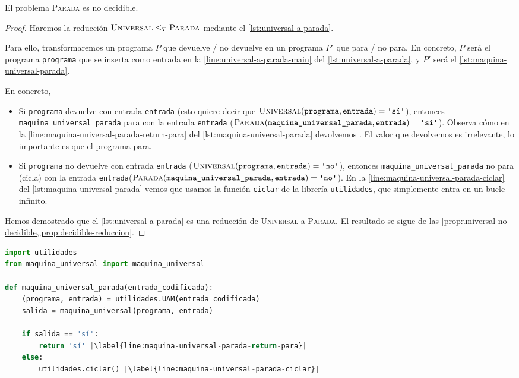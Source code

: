 \begin{proposicion}\label{prop:parada-no-decidible}
El problema \textsc{Parada} es no decidible.
\end{proposicion}
\begin{proof}
Haremos la reducción $\textsc{Universal}\leq_T\textsc{Parada}$ mediante el \cref{lst:universal-a-parada}.

Para ello, transformaremos un programa $P$ que devuelve  / no devuelve  en un programa $P'$ que para / no para. En concreto, $P$ será el programa \texttt{programa} que se inserta como entrada en la \cref{line:universal-a-parada-main} del \cref{lst:universal-a-parada}, y $P'$ será el \cref{lst:maquina-universal-parada}.

En concreto,
\begin{itemize}
    \item Si \texttt{programa} devuelve  con entrada \texttt{entrada} (esto quiere decir que \linebreak $\textsc{Universal}(\texttt{programa}, \texttt{entrada}) = \palabra{sí}$), entonces \texttt{maquina\_universal\_parada} para con la entrada \texttt{entrada} ($\textsc{Parada}(\texttt{maquina\_universal\_parada}, \texttt{entrada})=\palabra{sí}$). Observa cómo en la \cref{line:maquina-universal-parada-return-para} del \cref{lst:maquina-universal-parada} devolvemos . El valor que devolvemos es irrelevante, lo importante es que el programa para.
    \item Si \texttt{programa} no devuelve  con entrada \texttt{entrada} ($\textsc{Universal}(\texttt{programa}, \texttt{entrada}) = \palabra{no}$), entonces \texttt{maquina\_universal\_parada} no para (cicla) con la entrada \texttt{entrada}\linebreak($\textsc{Parada}(\texttt{maquina\_universal\_parada}, \texttt{entrada})=\palabra{no}$). En la \cref{line:maquina-universal-parada-ciclar} del \cref{lst:maquina-universal-parada} vemos que usamos la función \texttt{ciclar} de la librería \texttt{utilidades}, que simplemente entra en un bucle infinito.
\end{itemize}

Hemos demostrado que el \cref{lst:universal-a-parada} es una reducción de \textsc{Universal} a \textsc{Parada}. El resultado se sigue de las \cref{prop:universal-no-decidible,,prop:decidible-reduccion}.
\end{proof}
\vspace{8pt}
\begin{lstlisting}[language=Python, caption=\lstinline{maquina_universal_parada.py},label={lst:maquina-universal-parada}]
import utilidades
from maquina_universal import maquina_universal

def maquina_universal_parada(entrada_codificada):
    (programa, entrada) = utilidades.UAM(entrada_codificada)
    salida = maquina_universal(programa, entrada)

    if salida == 'sí':
        return 'sí' |\label{line:maquina-universal-parada-return-para}|
    else:
        utilidades.ciclar() |\label{line:maquina-universal-parada-ciclar}|
\end{lstlisting}

